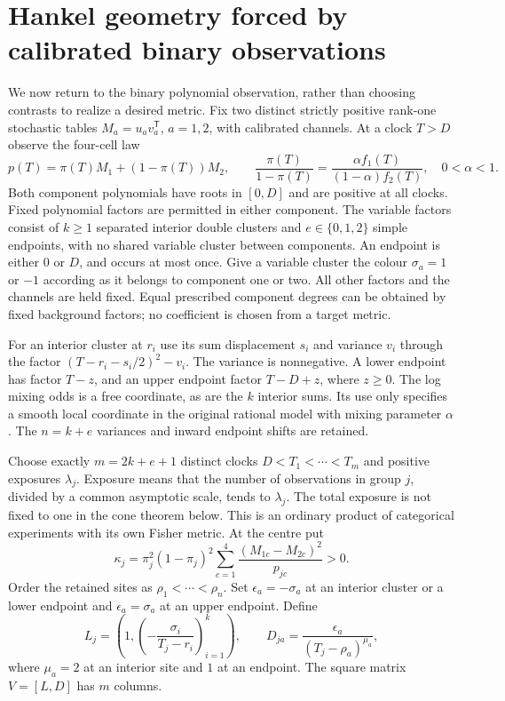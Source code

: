 \section{Hankel geometry forced by calibrated binary observations}\label{sec:binary-hankel}
We now return to the binary polynomial observation, rather than choosing
contrasts to realize a desired metric. Fix two distinct strictly positive
rank-one stochastic tables $M_a=u_av_a^{\mathsf T}$, $a=1,2$, with calibrated
channels. At a clock $T>D$ observe the four-cell law
\begin{equation}\label{eq:calibrated-binary}
 p(T)=\pi(T)M_1+(1-\pi(T))M_2,\qquad
 \frac{\pi(T)}{1-\pi(T)}=
 \frac{\alpha f_1(T)}{(1-\alpha)f_2(T)},\quad 0<\alpha<1.
\end{equation}
Both component polynomials have roots in $[0,D]$ and are positive at all
clocks. Fixed polynomial factors are permitted in either component.
The variable factors consist of $k\ge1$ separated interior double clusters
and $e\in\{0,1,2\}$ simple endpoints, with no shared variable cluster
between components. An endpoint is either $0$ or $D$, and occurs at most
once. Give a variable cluster the colour $\sigma_a=1$ or $-1$ according
as it belongs to component one or two. All other factors and the channels
are held fixed. Equal prescribed component degrees can be obtained by
fixed background factors; no coefficient is chosen from a target metric.

For an interior cluster at $r_i$ use its sum displacement $s_i$ and variance
$v_i$ through the factor $(T-r_i-s_i/2)^2-v_i$. The variance is nonnegative.
A lower endpoint has factor $T-z$, and an upper endpoint factor $T-D+z$,
where $z\ge0$. The log mixing odds is a free coordinate, as are the $k$
interior sums. Its use only specifies a smooth local coordinate in the
original rational model with mixing parameter $\alpha$.
The $n=k+e$ variances and inward endpoint shifts are retained.

Choose exactly $m=2k+e+1$ distinct clocks $D<T_1<\cdots<T_m$ and positive
exposures $\lambda_j$. Exposure means that the number of observations in
group $j$, divided by a common asymptotic scale, tends to $\lambda_j$.
The total exposure is not fixed to one in the cone theorem below. This is
an ordinary product of categorical experiments with its own Fisher metric.
At the centre put
\begin{equation}\label{eq:native-kappa}
 \kappa_j=\pi_j^2(1-\pi_j)^2
       \sum_{c=1}^4\frac{(M_{1c}-M_{2c})^2}{p_{jc}}>0.
\end{equation}
Order the retained sites as $\rho_1<\cdots<\rho_n$. Set
$\epsilon_a=-\sigma_a$ at an interior cluster or a lower endpoint and
$\epsilon_a=\sigma_a$ at an upper endpoint. Define
\begin{equation}\label{eq:binary-score}
 L_j=\left(1,\left(-\frac{\sigma_i}{T_j-r_i}\right)_{i=1}^k\right),
 \qquad
 D_{ja}=\frac{\epsilon_a}{(T_j-\rho_a)^{\mu_a}},
\end{equation}
where $\mu_a=2$ at an interior site and $1$ at an endpoint. The square
matrix $V=[L,D]$ has $m$ columns.

